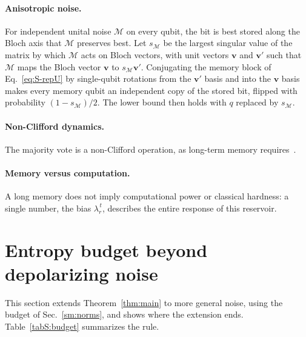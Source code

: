 \documentclass[aps,prl,twocolumn,superscriptaddress,floatfix]{revtex4-2}
\theoremstyle{plain}
\begin{document}
\paragraph*{Anisotropic noise.} For independent unital noise $\mathcal M$ on every qubit, the bit is best stored along the Bloch axis that $\mathcal M$ preserves best. Let $s_{\mathcal M}$ be the largest singular value of the matrix by which $\mathcal M$ acts on Bloch vectors, with unit vectors $\bm v$ and $\bm v'$ such that $\mathcal M$ maps the Bloch vector $\bm v$ to $s_{\mathcal M}\bm v'$. Conjugating the memory block of Eq.~\eqref{eq:S-repU} by single-qubit rotations from the $\bm v'$ basis and into the $\bm v$ basis makes every memory qubit an independent copy of the stored bit, flipped with probability $(1-s_{\mathcal M})/2$. The lower bound then holds with $q$ replaced by $s_{\mathcal M}$.

\paragraph*{Non-Clifford dynamics.} The majority vote is a non-Clifford operation, as long-term memory requires~\cite{Nelson2026}.

\paragraph*{Memory versus computation.} A long memory does not imply computational power or classical hardness: a single number, the bias $\lambda_r^{\,t}$, describes the entire response of this reservoir.

\section{Entropy budget beyond depolarizing noise}
\label{sm:budget}

This section extends Theorem~\ref{thm:main} to more general noise, using the budget of Sec.~\ref{sm:norms}, and shows where the extension ends. Table~\ref{tabS:budget} summarizes the rule.
\end{document}
